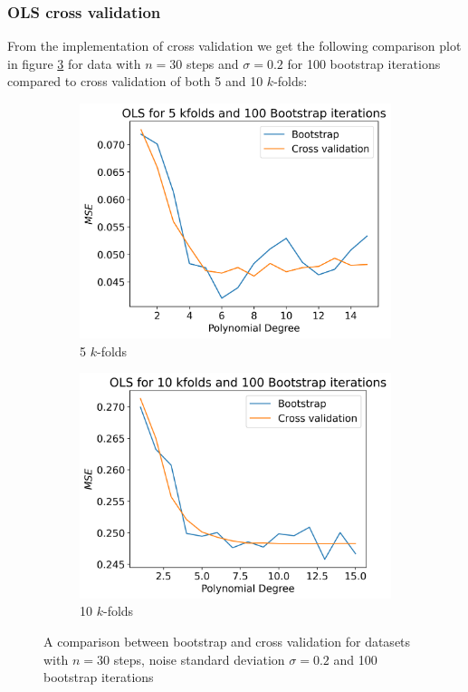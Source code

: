 \documentclass[12pt]{article}
\begin{document}
\subsubsection{OLS cross validation}
From the implementation of cross validation we get the following comparison plot in figure \ref{fig:cv_comp} for data with $n=30$ steps and $\sigma=0.2$ for 100 bootstrap iterations compared to cross validation of both 5 and 10 $k$-folds:
\begin{figure}[H]
  \begin{subfigure}{.5\textwidth}
    \centering
    \includegraphics[width=\textwidth]{../figures/boot_cv_comp_OLS_100_5.png}
    \caption{5 $k$-folds}
    \label{fig:train_test_resample_mse}
  \end{subfigure}
  \begin{subfigure}{.5\textwidth}
    \centering
    \includegraphics[width=\textwidth]{../figures/boot_cv_comp_OLS_100_10.png}
    \caption{10 $k$-folds}
    \label{fig:}
  \end{subfigure}
  \caption{A comparison between bootstrap and cross validation for datasets with $n=30$ steps, noise standard deviation $\sigma=0.2$ and 100 bootstrap iterations}
  \label{fig:cv_comp}
\end{figure}
\end{document}

